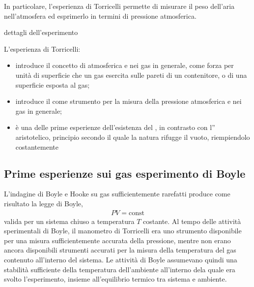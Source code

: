 \documentclass[letterpaper,10pt,italian]{jupyterBook}
\begin{document}
\sphinxAtStartPar
In particolare, l’esperienza di Torricelli permette di misurare il peso dell’aria nell’atmosfera ed esprimerlo in termini di pressione atmosferica.

\sphinxAtStartPar
  dettagli dell’esperimento 

\sphinxAtStartPar
L’esperienza di Torricelli:
\begin{itemize}
\item {} 
\sphinxAtStartPar
introduce il concetto di  atmosferica e nei gas in generale, come forza per unità di superficie che un gas esercita sulle pareti di un contenitore, o di una superficie esposta al gas;

\item {} 
\sphinxAtStartPar
introduce il  come strumento per la misura della pressione atmosferica e nei gas in generale;

\item {} 
\sphinxAtStartPar
è una delle prime esperienze dell’esistenza del , in contrasto con l” aristotelico, principio secondo il quale la natura rifugge il vuoto, riempiendolo costantemente

\end{itemize}


\subsection{Prime esperienze sui gas \sphinxhyphen{} esperimento di Boyle}
\label{\detokenize{ch/thermodynamics/foundation-experiments:prime-esperienze-sui-gas-esperimento-di-boyle}}
\sphinxAtStartPar
L’indagine di Boyle e Hooke su gas sufficientemente rarefatti produce come risultato la legge di Boyle,
\begin{equation*}
\begin{split}P V = \text{const}\end{split}
\end{equation*}
\sphinxAtStartPar
valida per un sistema chiuso a temperatura \(T\) costante. Al tempo delle attività sperimentali di Boyle, il manometro di Torricelli era uno strumento disponibile per una misura sufficientemente accurata della pressione, mentre non erano ancora disponibili strumenti accurati per la misura della temperatura del gas contenuto all’interno del sistema. Le attività di Boyle assumevano quindi una stabilità sufficiente della temperatura dell’ambiente all’interno dela quale era svolto l’esperimento, insieme all’equilibrio termico tra sistema e ambiente.
\end{document}

